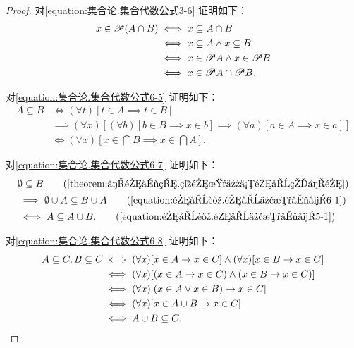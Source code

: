 \begin{property}
\begin{proof}
对\cref{equation:集合论.集合代数公式3-6} 证明如下：
\begin{align*}
	x \in \mathscr{P} (A \cap B)
	&\iff x \subseteq A \cap B \\
	&\iff x \subseteq A \land x \subseteq B \\
	&\iff x \in \mathscr{P} A \land x \in \mathscr{P} B \\
	&\iff x \in \mathscr{P} A \cap \mathscr{P} B.
\end{align*}

对\cref{equation:集合论.集合代数公式6-5} 证明如下：
\begin{align*}
	A \subseteq B
	&\iff (\forall t)[t \in A \implies t \in B] \\
	&\implies (\forall x)[
		(\forall b)[b \in B \implies x \in b]
		\implies
		(\forall a)[a \in A \implies x \in a]
	] \\
	&\iff (\forall x)[x \in \bigcap B \implies x \in \bigcap A].
\end{align*}

对\cref{equation:集合论.集合代数公式6-7} 证明如下：
\begin{align*}
	&\emptyset \subseteq B
		\tag{\cref{theorem:子集公理.空集是任何集合的子集}} \\
	&\implies \emptyset \cup A \subseteq B \cup A
		\tag{\cref{equation:集合论.集合代数公式6-1}} \\
	&\iff A \subseteq A \cup B.
		\tag{\cref{equation:集合论.集合代数公式5-1}}
\end{align*}

对\cref{equation:集合论.集合代数公式6-8} 证明如下：
\begin{align*}
	A \subseteq C, B \subseteq C
	&\iff (\forall x)[x \in A \rightarrow x \in C] \land (\forall x)[x \in B \rightarrow x \in C] \\
	&\iff (\forall x)[(x \in A \rightarrow x \in C) \land (x \in B \rightarrow x \in C)] \\
	&\iff (\forall x)[(x \in A \lor x \in B) \rightarrow x \in C] \\
	&\iff (\forall x)[x \in A \cup B \rightarrow x \in C] \\
	&\iff A \cup B \subseteq C.
	\qedhere
\end{align*}
\end{proof}
\end{property}

